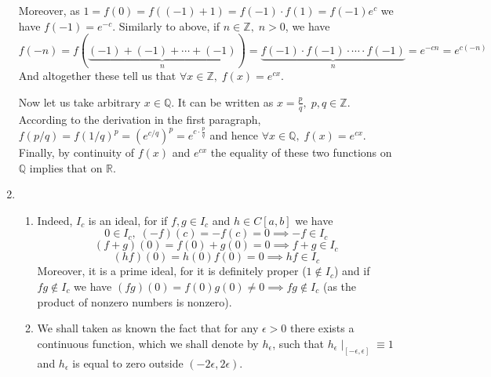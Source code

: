 \documentclass[8pt]{article} %
\begin{document}
\begin{enumerate}[label=\bfseries Problem \arabic*.]
{		Moreover, as $1=f(0)=f((-1)+1)=f(-1)\cdot f(1)=f(-1)e^{c}$ we have $f(-1)=e^{-c}$. Similarly to above, if $n\in
		\mathbb{Z},\; n>0$, we have
		$f(-n)=f\left(\underbrace{
		(-1)+(-1)+\cdots+(-1)}_{n}\right)=\underbrace{f(-1)\cdot f(-1)\cdot\cdots\cdot f(-1)}_{n}=e^{-cn}=e^{c(-n)}$
		And altogether these tell us that $\forall x\in\mathbb{Z},\;f(x)=e^{cx}$.

		Now let us take arbitrary $x\in\mathbb{Q}$. It can be written as $x=\frac{p}{q},\;p,q\in\mathbb{Z}$. According to the derivation
		in the first paragraph, $f(p/q)=f(1/q)^p=(e^{c/q})^p=e^{c\cdot \frac{p}{q}}$ and hence $\forall x\in\mathbb{Q},\;f(x)=e^{cx}$.
		Finally, by continuity of $f(x)$ and $e^{cx}$ the equality of these two functions on $\mathbb{Q}$ implies that on $\mathbb{R}$.
		}
	\item{
		\begin{enumerate}[label=(\arabic*)]
			\item{Indeed, $I_c$ is an ideal, for if $f,g\in I_c$ and $h\in C[a,b]$ we have
				\[0\in I_c,\;(-f)(c)=-f(c)=0\implies -f\in I_c\]
				\[(f+g)(0)=f(0)+g(0)=0\implies f+g\in I_c\]
				\[(hf)(0)=h(0)f(0)=0\implies hf\in I_c\]
				Moreover, it is a prime ideal, for it is definitely proper ($1\notin I_c$) and
				if $fg\notin
				I_c$ we have $(fg)(0)=f(0)g(0)\neq 0\implies fg\notin I_c$ (as the product of nonzero numbers is nonzero).
				}
			\item{We shall taken as known the fact that for any $\epsilon>0$ there exists a continuous function, which we shall denote
				by $h_{\epsilon}$, such that $h_{\epsilon}\mid_{[-\epsilon,\epsilon]}\equiv 1$ and $h_{\epsilon}$ is equal to zero
				outside $(-2\epsilon,2\epsilon)$.
				
}
\end{enumerate}}
\end{enumerate}
\end{document}
